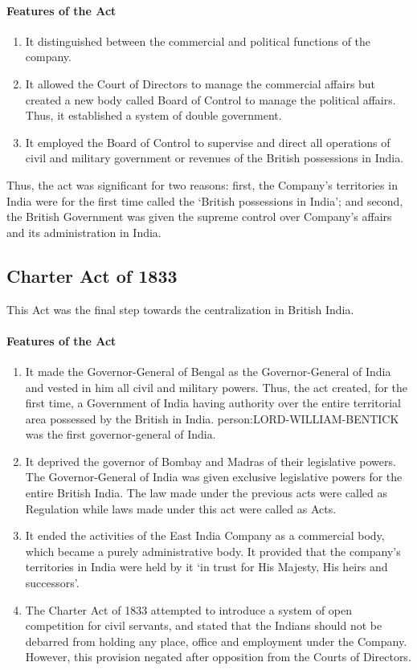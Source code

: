\paragraph{Features of the Act}
\begin{enumerate}
  \item It distinguished between the commercial and political functions of the company.
  \item It allowed the Court of Directors to manage the commercial affairs but created a new body called Board of Control to manage the political affairs. Thus, it established a system of double government.
  \item It employed the Board of Control to supervise and direct all operations of civil and military government or revenues of the British possessions in India.
\end{enumerate}

Thus, the act was significant for two reasons: first, the Company's territories in India were for the first time called the `British possessions in India'; and second, the British Government was given the supreme control over Company's affairs and its administration in India.

\subsection{Charter Act of 1833}

This Act was the final step towards the centralization in British India.

\paragraph{Features of the Act}
\begin{enumerate}
  \item It made the Governor-General of Bengal as the Governor-General of India and vested in him all civil and military powers. Thus, the act created, for the first time, a Government of India having authority over the entire territorial area possessed by the British in India. \gls{person:LORD-WILLIAM-BENTICK} was the first governor-general of India.
  \item It deprived the governor of Bombay and Madras of their legislative powers. The Governor-General of India was given exclusive legislative powers for the entire British India. The law made under the previous acts were called as Regulation while laws made under this act were called as Acts.
  \item It ended the activities of the East India Company as a commercial body, which became a purely administrative body. It provided that the company's territories in India were held by it `in trust for His Majesty, His heirs and successors'.
  \item The Charter Act of 1833 attempted to introduce a system of open competition for civil servants, and stated that the Indians should not be debarred from holding any place, office and employment under the Company. However, this provision negated after opposition from the Courts of Directors.
\end{enumerate}

